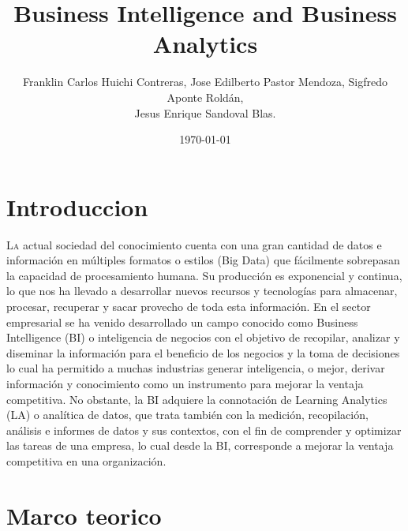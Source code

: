 \documentclass[twoside,twocolumn]{article}
\title{Business Intelligence and Business Analytics}
\author{Franklin Carlos Huichi Contreras, Jose Edilberto Pastor Mendoza, Sigfredo Aponte Roldán, \\
 Jesus Enrique Sandoval Blas. }
\date{\today}
\begin{document}
\maketitle


\section{Introduccion}
\lettrine[nindent=0em,lines=3]{L}a actual sociedad del conocimiento cuenta con una gran cantidad de datos e información en múltiples formatos o estilos (Big Data) que fácilmente sobrepasan la capacidad de procesamiento humana. Su producción es exponencial y continua, lo que nos ha llevado a desarrollar nuevos recursos y tecnologías para almacenar, procesar, recuperar y sacar provecho de toda esta información. En el sector empresarial se ha venido desarrollado un campo conocido como Business Intelligence (BI) o inteligencia de negocios con el objetivo de recopilar, analizar y diseminar la información para el beneficio de los negocios y la toma de decisiones
lo cual ha permitido a muchas industrias generar inteligencia, o mejor, derivar información y conocimiento como un instrumento para
mejorar la ventaja competitiva.  No obstante, la BI adquiere la connotación de Learning Analytics (LA) o analítica de datos, que trata también con la medición, recopilación, análisis e informes de datos y sus contextos, con el fin de comprender y optimizar las tareas de una empresa, lo cual desde la BI, corresponde a mejorar la ventaja competitiva en una organización.



\section{Marco teorico}
\end{document}
